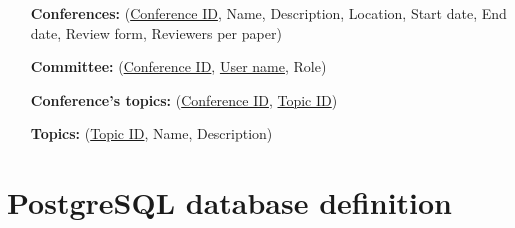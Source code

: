 \documentclass[12pt]{article}
\newcommand{\<}{\langle}
\renewcommand{\>}{\rangle}
\begin{document}
\begin{enumerate}
\item[\textbf{Conferences:}](\underline{Conference ID}, Name, Description, Location, Start date, End date, Review form, Reviewers per paper)

\item[\textbf{Committee:}](\underline{Conference ID}, \underline{User name}, Role)

\item[\textbf{Conference's topics:}](\underline{Conference ID}, \underline{Topic ID})

\item[\textbf{Topics:}](\underline{Topic ID}, Name, Description)
\end{enumerate}
\pagebreak
\part{PostgreSQL database definition}
\end{document}

